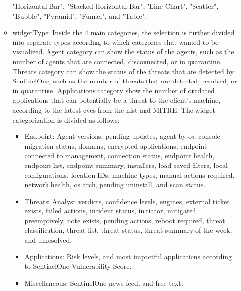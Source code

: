 \begin{multicols}{2}
\begin{itemize}
\begin{itemize}
                              "Horizontal Bar", "Stacked Horizontal Bar", "Line Chart", "Scatter", "Bubble", "Pyramid", "Funnel", and "Table".
                        \item widgetType: Inside the 4 main categories, the selection is further divided into separate types according to which
                              categories that wanted to be visualized. Agent category can show the status of the agents, such as the number of agents
                              that are connected, disconnected, or in quarantine. Threats category can show the status of the threats that are
                              detected by SentinelOne, such as the number of threats that are detected, resolved, or in quarantine. Applications
                              category show the number of outdated applications that can potentially be a threat to the client's machine, according
                              to the latest \acrshort{cve}s from the \acrshort{nist} and MITRE. The widget categorization is divided as follows:
                              \begin{itemize}
                                    \item Endpoint: Agent versions, pending updates, agent by \acrshort{os}, console migration status, domains,
                                          encrypted applications, endpoint connected to management, connection status, endpoint health, endpoint list,
                                          endpoint summary, installers, load saved filters, local configurations, location IDs, machine types, manual
                                          actions required, network health, \acrshort{os} arch, pending uninstall, and scan status.
                                    \item Threats: Analyst verdicts, confidence levels, engines, external ticket exists, failed actions, incident status,
                                          initiator, mitigated preemptively, note exists, pending actions, reboot required, threat classification,
                                          threat list, threat status, threat summary of the week, and unresolved.
                                    \item Applications: Risk levels, and most impactful applications according to SentinelOne Vulnerability Score.
                                    \item Miscellaneous: SentinelOne news feed, and free text.
                              \end{itemize}
                  \end{itemize}
      \end{itemize}


\end{multicols}
